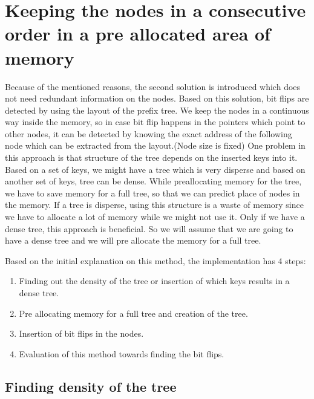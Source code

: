 \documentclass{report}
\begin{document}
\section{Keeping the nodes in a consecutive order in a pre allocated area of memory}

 Because of the mentioned reasons, the second solution is introduced which does not need redundant information on the nodes. Based on this solution, bit flips are detected by using the layout of the prefix tree. We keep the nodes in a continuous way inside the memory, so in case bit flip happens in the pointers which point to other nodes, it can be detected by knowing the exact address of the following node which can be extracted from the layout.(Node size is fixed) One problem in this approach is that structure of the tree depends on the inserted keys into it. Based on a set of keys, we might have a tree which is very disperse and based on another set of keys, tree can be dense. While preallocating memory for the tree, we have to save memory for a full tree, so that we can predict place of nodes in the memory. If a tree is disperse, using this structure is a waste of memory since we have to allocate a lot of memory while we might not use it. Only if we have a dense tree, this approach is beneficial. So we will assume that we are going to have a dense tree and we will pre allocate the memory for a full tree.

Based on the initial explanation on this method, the implementation has 4 steps:

\begin{enumerate}
  \item Finding out the density of the tree or insertion of which keys results in a dense tree.
  \item Pre allocating memory for a full tree and creation of the tree.
  \item Insertion of bit flips in the nodes.
  \item Evaluation of this method towards finding the bit flips.
\end{enumerate}  

\subsection{Finding density of the tree}
\end{document}
